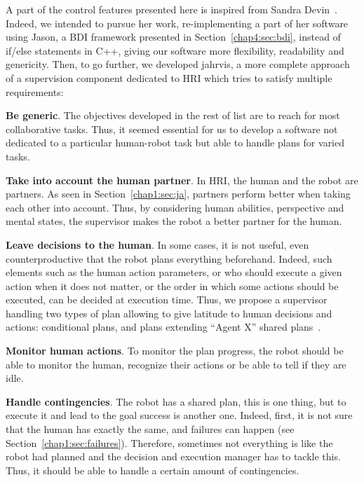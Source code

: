 \documentclass[a4paper,11pt,twoside]{StyleThese}
\begin{document}
A part of the control features presented here is inspired from Sandra Devin~\cite{devin_2017_decisional}. Indeed, we intended to pursue her work, re-implementing a part of her software using Jason, a BDI framework presented in Section~\ref{chap4:sec:bdi}, instead of if/else statements in C++, giving our software more flexibility, readability and genericity.
Then, to go further, we developed \acrshort{jahrvis}, a more complete approach of a supervision component dedicated to HRI which tries to satisfy multiple requirements:

\begin{bulletList}
	\item \textbf{Be generic}. The objectives developed in the rest of list are to reach for most collaborative tasks. Thus, it seemed essential for us to develop a software not dedicated to a particular human-robot task but able to handle plans for varied tasks. 
	\item \textbf{Take into account the human partner}. In HRI, the human and the robot are partners. As seen in Section~\ref{chap1:sec:ja}, partners perform better when taking each other into account. Thus, by considering human abilities, perspective and mental states, the supervisor makes the robot a better partner for the human.
	\item \textbf{Leave decisions to the human}. In some cases, it is not useful, even counterproductive that the robot plans everything beforehand. Indeed, such elements such as the human action parameters, or who should execute a given action when it does not matter, or the order in which some actions should be executed, can be decided at execution time. Thus, we propose a supervisor handling two types of plan allowing to give latitude to human decisions and actions: conditional plans, and plans extending ``Agent X'' shared plans~\cite{devin_2017_decisions}.
	\item \textbf{Monitor human actions}. To monitor the plan progress, the robot should be able to monitor the human, \ie recognize their actions or be able to tell if they are idle.
	\item \textbf{Handle contingencies}. The robot has a shared plan, this is one thing, but to execute it and lead to the goal success is another one. Indeed, first, it is not sure that the human has exactly the same, and failures can happen (see Section~\ref{chap1:sec:failures}). Therefore, sometimes not everything is like the robot had planned and the decision and execution manager has to tackle this. Thus, it should be able to handle a certain amount of contingencies.

\end{bulletList}
\end{document}

